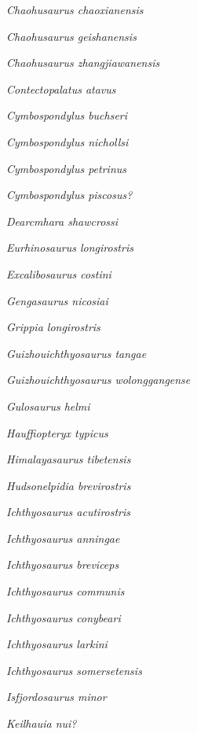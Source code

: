 \emph{Chaohusaurus chaoxianensis}~\cite{Chen1985RGC}

\emph{Chaohusaurus geishanensis}~\cite{Young1972MNIGP}

\emph{Chaohusaurus zhangjiawanensis}~\cite{Chen2013AGS}

\emph{Contectopalatus atavus}~\cite{Quenstedt1852}

\emph{Cymbospondylus buchseri}~\cite{Sander1989JVP}

\emph{Cymbospondylus nichollsi}~\cite{Frobisch2006ZJLS}

\emph{Cymbospondylus petrinus}~\cite{Leidy1868PANSP}

\emph{Cymbospondylus piscosus?}~\cite{Leidy1868PANSP}

\emph{Dearcmhara shawcrossi}~\cite{Brusatte2015SJGa}

\emph{Eurhinosaurus longirostris}~\cite{Mantell1851}

\emph{Excalibosaurus costini}~\cite{McGowan1986N}

\emph{Gengasaurus nicosiai}~\cite{Paparella2016GM}

\emph{Grippia longirostris}~\cite{Wiman1929BGIU}

\emph{Guizhouichthyosaurus tangae}~\cite{Yin2000GG}

\emph{Guizhouichthyosaurus wolonggangense}~\cite{Chen2007GC}

\emph{Gulosaurus helmi}~\cite{Cuthbertson2013JVP}

\emph{Hauffiopteryx typicus}~\cite{Maisch2008P}

\emph{Himalayasaurus tibetensis}~\cite{Young1972MNIGP}

\emph{Hudsonelpidia brevirostris}~\cite{McGowan1995CJES}

\emph{Ichthyosaurus acutirostris}~\cite{Owen1840RBAAS}

\emph{Ichthyosaurus anningae}~\cite{Lomax2015JVP}

\emph{Ichthyosaurus breviceps}~\cite{Owen1881MPS}

\emph{Ichthyosaurus communis}~\cite{Conybeare1822TGSL}

\emph{Ichthyosaurus conybeari}~\cite{Lydekker1888GM}

\emph{Ichthyosaurus larkini}~\cite{Lomax2017PP}

\emph{Ichthyosaurus somersetensis}~\cite{Lomax2017PP}

\emph{Isfjordosaurus minor}~\cite{Wiman1910BGIUa}

\emph{Keilhauia nui?}~\cite{Delsett2017PO}

